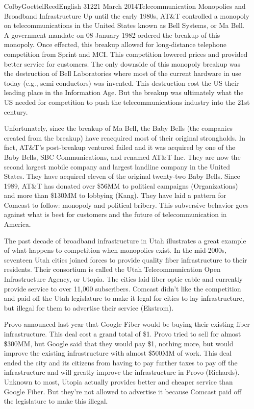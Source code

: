 \documentclass[12pt]{article}
\begin{document}
\begin{mla}{Colby}{Goettel}{Reed}{English 312}{21 March 2014}{Telecommunication Monopolies and Broadband Infrastructure}
Up until the early 1980s, AT\&T controlled a monopoly on telecommunications in the United States known as Bell Systems, or Ma Bell. A government mandate on 08 January 1982 ordered the breakup of this monopoly. Once effected, this breakup allowed for long-distance telephone competition from Sprint and MCI. This competition lowered prices and provided better service for customers. The only downside of this monopoly breakup was the destruction of Bell Laboratories where most of the current hardware in use today (e.g., semi-conductors) was invented. This destruction cost the US their leading place in the Information Age. But the breakup was ultimately what the US needed for competition to push the telecommunications industry into the 21st century.

Unfortunately, since the breakup of Ma Bell, the Baby Bells (the companies created from the breakup) have reacquired most of their original strongholds. In fact, AT\&T's post-breakup ventured failed and it was acquired by one of the Baby Bells, SBC Communications, and renamed AT\&T Inc. They are now the second largest mobile company and largest landline company in the United States. They have acquired eleven of the original twenty-two Baby Bells. Since 1989, AT\&T has donated over \$56MM to political campaigns (Organizations) and more than \$130MM to lobbying (Kang). They have laid a pattern for Comcast to follow: monopoly and political bribery. This subversive behavior goes against what is best for customers and the future of telecommunication in America.

The past decade of broadband infrastructure in Utah illustrates a great example of what happens to competition when monopolies exist. In the mid-2000s, seventeen Utah cities joined forces to provide quality fiber infrastructure to their residents. Their consortium is called the Utah Telecommunication Open Infrastructure Agency, or Utopia. The cities laid fiber optic cable and currently provide service to over 11,000 subscribers. Comcast didn't like the competition and paid off the Utah legislature to make it legal for cities to lay infrastructure, but illegal for them to advertise their service (Ekstrom).

Provo announced last year that Google Fiber would be buying their existing fiber infrastructure. This deal cost a grand total of \$1. Provo tried to sell for almost \$300MM, but Google said that they would pay \$1, nothing more, but would improve the existing infrastructure with almost \$500MM of work. This deal ended the city and its citizens from having to pay further taxes to pay off the infrastructure and will greatly improve the infrastructure in Provo (Richards). Unknown to most, Utopia actually provides better and cheaper service than Google Fiber. But they're not allowed to advertise it because Comcast paid off the legislature to make this illegal.


\end{mla}
\end{document}
